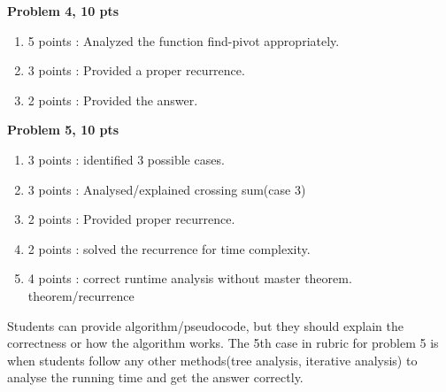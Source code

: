 \documentclass[11pt]{article}
\begin{document}
\begin{qunlist}
{\bf Problem 4, 10 pts}
\begin{enumerate}
    \item 5 points : Analyzed the function find-pivot appropriately.
    \item 3 points : Provided a proper recurrence.
    \item 2 points : Provided the answer.
\end{enumerate}

{\bf Problem 5, 10 pts}
\begin{enumerate}
    \item 3 points : identified 3 possible cases.
    \item 3 points : Analysed/explained crossing sum(case 3)
    \item 2 points : Provided proper recurrence.
    \item 2 points : solved the recurrence for time complexity.
    \item 4 points : correct runtime analysis without master theorem. theorem/recurrence
\end{enumerate}

Students can provide algorithm/pseudocode, but they should explain the correctness or how the algorithm works.
The 5th case in rubric for problem 5 is when students follow any other methods(tree analysis, iterative analysis) to analyse the running time and get the answer correctly.

\end{qunlist}
\end{document}

